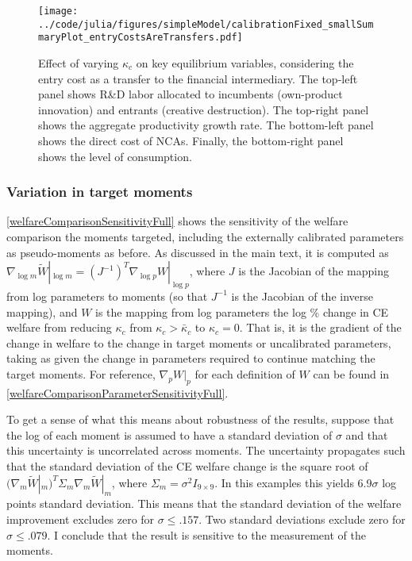 \documentclass[11pt,english]{article}
\theoremstyle{definition}
\begin{document}
\begin{figure}[]
	\centering
	\texttt{[image: ../code/julia/figures/simpleModel/calibrationFixed\_smallSummaryPlot\_entryCostsAreTransfers.pdf]}
	\caption{Effect of varying $\kappa_c$ on key equilibrium variables, considering the entry cost as a transfer to the financial intermediary. The top-left panel shows R\&D labor allocated to incumbents (own-product innovation) and entrants (creative destruction). The top-right panel shows the aggregate productivity growth rate. The bottom-left panel shows the direct cost of NCAs. Finally, the bottom-right panel shows the level of consumption.}
	\label{calibration_smallSummaryPlot_entryCostsAsTransfers}
\end{figure}


\subsubsection{Variation in target moments}

\autoref{welfareComparisonSensitivityFull} shows the sensitivity of the welfare comparison the moments targeted, including the externally calibrated parameters as pseudo-moments as before. As discussed in the main text, it is computed as $\nabla_{\log m} \tilde{W}|_{\log m} = (J^{-1})^T \nabla_{\log p} W|_{\log p}$, where $J$ is the Jacobian of the mapping from log parameters to moments (so that $J^{-1}$ is the Jacobian of the inverse mapping), and $W$ is the mapping from log parameters the log \% change in CE welfare from reducing $\kappa_c$ from $\kappa_c > \bar{\kappa}_c$ to $\kappa_c = 0$. That is, it is the gradient of the change in welfare to the change in target moments or uncalibrated parameters, taking as given the change in parameters required to continue matching the target moments. For reference, $\nabla_p W|_p$  for each definition of $W$ can be found in \autoref{welfareComparisonParameterSensitivityFull}.

To get a sense of what this means about robustness of the results, suppose that the log of each moment is assumed to have a standard deviation of $\sigma$ and that this uncertainty is uncorrelated across moments. The uncertainty propagates such that the standard deviation of the CE welfare change is the square root of $(\nabla_m \tilde{W}|_m)^T \Sigma_m \nabla_m \tilde{W}|_m$, where $\Sigma_m = \sigma^2 I_{9\times 9}$. In this examples this yields 6.9$\sigma$ log points standard deviation. This means that the standard deviation of the welfare improvement excludes zero for $\sigma \le .157$. Two standard deviations exclude zero for $\sigma \le .079$. I conclude that the result is sensitive to the measurement of the moments.
\end{document}
